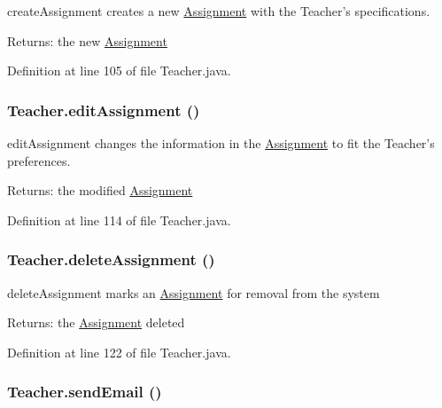 createAssignment creates a new \hyperlink{classAssignment}{Assignment} with the Teacher's specifications. 

\begin{Desc}
\item[Returns:]the new \hyperlink{classAssignment}{Assignment} \end{Desc}


Definition at line 105 of file Teacher.java.\hypertarget{classTeacher_eace6c71e6c487ba11452db814258a3d}{
\subsubsection{ Teacher.editAssignment ()}}
\label{classTeacher_eace6c71e6c487ba11452db814258a3d}


editAssignment changes the information in the \hyperlink{classAssignment}{Assignment} to fit the Teacher's preferences. 

\begin{Desc}
\item[Returns:]the modified \hyperlink{classAssignment}{Assignment} \end{Desc}


Definition at line 114 of file Teacher.java.\hypertarget{classTeacher_6c0a15bb3a1bc765bf9e4159afdc34b2}{
\subsubsection{ Teacher.deleteAssignment ()}}
\label{classTeacher_6c0a15bb3a1bc765bf9e4159afdc34b2}


deleteAssignment marks an \hyperlink{classAssignment}{Assignment} for removal from the system 

\begin{Desc}
\item[Returns:]the \hyperlink{classAssignment}{Assignment} deleted \end{Desc}


Definition at line 122 of file Teacher.java.\hypertarget{classTeacher_7092ebe3cf6398d9584a8fd214649a24}{
\subsubsection{ Teacher.sendEmail ()}}
\label{classTeacher_7092ebe3cf6398d9584a8fd214649a24}


